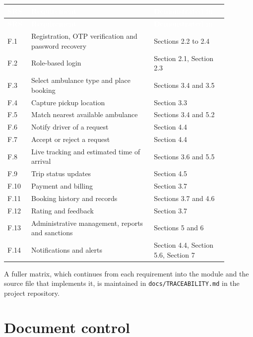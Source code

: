 \documentclass[11pt,a4paper]{article}
\newcommand{\thead}[1]{\textcolor{white}{\textbf{#1}}}
\begin{document}
\begin{center}
\small
\begin{longtable}{L{0.08\linewidth} L{0.50\linewidth} L{0.30\linewidth}}
\thead{SRS} & \thead{Requirement} & \thead{Demonstrated in} \\
\endfirsthead
{}\thead{SRS} & \thead{Requirement} & \thead{Demonstrated in} \\
\endhead
F.1 & Registration, OTP verification and password recovery & Sections 2.2 to 2.4 \\
F.2 & Role-based login & Section 2.1, Section 2.3 \\
F.3 & Select ambulance type and place booking & Sections 3.4 and 3.5 \\
F.4 & Capture pickup location & Section 3.3 \\
F.5 & Match nearest available ambulance & Sections 3.4 and 5.2 \\
F.6 & Notify driver of a request & Section 4.4 \\
F.7 & Accept or reject a request & Section 4.4 \\
F.8 & Live tracking and estimated time of arrival & Sections 3.6 and 5.5 \\
F.9 & Trip status updates & Section 4.5 \\
F.10 & Payment and billing & Section 3.7 \\
F.11 & Booking history and records & Sections 3.7 and 4.6 \\
F.12 & Rating and feedback & Section 3.7 \\
F.13 & Administrative management, reports and sanctions & Sections 5 and 6 \\
F.14 & Notifications and alerts & Section 4.4, Section 5.6, Section 7 \\
\end{longtable}
\end{center}

A fuller matrix, which continues from each requirement into the module and the
source file that implements it, is maintained in \texttt{docs/TRACEABILITY.md}
in the project repository.

\section{Document control}
\end{document}
